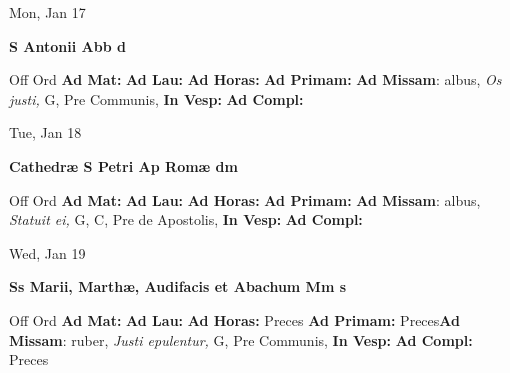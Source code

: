 \documentclass[10pt]{book}
\begin{document}
\begin{center}
\begin{minipage}{3.5in}
\vspace{2em}
\begin{center}Mon, Jan 17
\end{center}
\textbf{ \large S Antonii Abb
\textnormal{\normalsize d}}

\begin{justify}Off Ord
\textbf{Ad Mat: }
\textbf{Ad Lau: }
\textbf{Ad Horas: }
\textbf{Ad Primam: }\textbf{Ad Missam}: albus, \textit{Os justi,} G, Pre Communis, 
\textbf{In Vesp: }
\textbf{Ad Compl: }
\end{justify}
\end{minipage}
\end{center}

\begin{center}
\begin{minipage}{3.5in}
\vspace{2em}
\begin{center}Tue, Jan 18
\end{center}
\textbf{ \large Cathedræ S Petri Ap Romæ
\textnormal{\normalsize dm}}

\begin{justify}Off Ord
\textbf{Ad Mat: }
\textbf{Ad Lau: }
\textbf{Ad Horas: }
\textbf{Ad Primam: }\textbf{Ad Missam}: albus, \textit{Statuit ei,} G, C, Pre de Apostolis, 
\textbf{In Vesp: }
\textbf{Ad Compl: }
\end{justify}
\end{minipage}
\end{center}

\begin{center}
\begin{minipage}{3.5in}
\vspace{2em}
\begin{center}Wed, Jan 19
\end{center}
\textbf{ \large Ss Marii, Marthæ, Audifacis et Abachum Mm
\textnormal{\normalsize s}}

\begin{justify}Off Ord
\textbf{Ad Mat: }
\textbf{Ad Lau: }
\textbf{Ad Horas: }Preces
\textbf{Ad Primam: }Preces\textbf{Ad Missam}: ruber, \textit{Justi epulentur,} G, Pre Communis, 
\textbf{In Vesp: }
\textbf{Ad Compl: }Preces
\end{justify}
\end{minipage}
\end{center}
\end{document}
